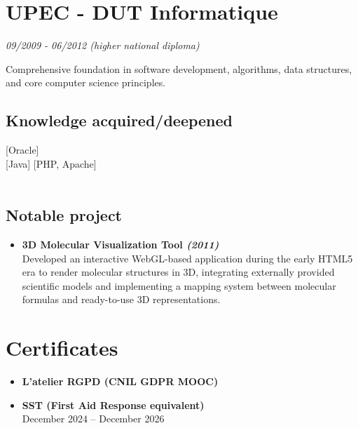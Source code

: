 {    %

    \section[\faMortarBoard]{UPEC - DUT Informatique}
    \textit{09/2009 - 06/2012 (higher national diploma)}

    Comprehensive foundation in software development, algorithms, data structures, and core computer science principles.

    \subsection{Knowledge acquired/deepened}
      [Oracle] \\
     [Java] [PHP, Apache]\\
    \

    \subsection{Notable project}
    \begin{itemize}[label=\faTrophy]
        \item \textbf{3D Molecular Visualization Tool \textit{(2011)}}
            \\Developed an interactive WebGL-based application during the early HTML5 era to render molecular structures in 3D, 
            integrating externally provided scientific models and implementing a mapping system between molecular formulas and ready-to-use 3D representations.
    \end{itemize}


    \section[\faCertificate]{Certificates}

    \begin{itemize}[label=\faCertificate]
        \item \textbf{L’atelier RGPD (CNIL GDPR MOOC)}
        \item \textbf{SST (First Aid Response equivalent)}
            \\December 2024 – December 2026
    \end{itemize}

}
\makebody